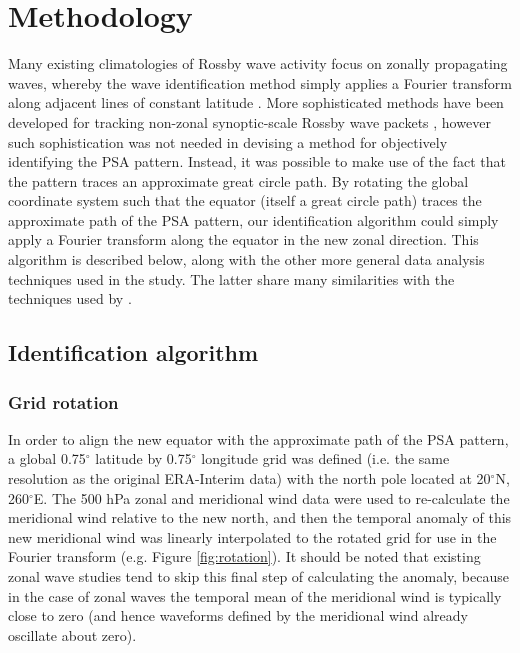 \section{Methodology}

Many existing climatologies of Rossby wave activity focus on zonally propagating waves, whereby the wave identification method simply applies a Fourier transform along adjacent lines of constant latitude \citep[e.g.][]{Glatt2014,IrvingSimmonds2015}. More sophisticated methods have been developed for tracking non-zonal synoptic-scale Rossby wave packets \citep[e.g.][]{Zimin2006,Souders2014}, however such sophistication was not needed in devising a method for objectively identifying the PSA pattern. Instead, it was possible to make use of the fact that the pattern traces an approximate great circle path. By rotating the global coordinate system such that the equator (itself a great circle path) traces the approximate path of the PSA pattern, our identification algorithm could simply apply a Fourier transform along the equator in the new zonal direction. This algorithm is described below, along with the other more general data analysis techniques used in the study. The latter share many similarities with the techniques used by \citet{IrvingSimmonds2015}.

\subsection{Identification algorithm}

\subsubsection{Grid rotation}

In order to align the new equator with the approximate path of the PSA pattern, a global 0.75$^{\circ}$ latitude by 0.75$^{\circ}$ longitude grid was defined (i.e. the same resolution as the original ERA-Interim data) with the north pole located at 20$^{\circ}$N, 260$^{\circ}$E. The 500 hPa zonal and meridional wind data were used to re-calculate the meridional wind relative to the new north, and then the temporal anomaly of this new meridional wind was linearly interpolated to the rotated grid for use in the Fourier transform (e.g. Figure \ref{fig:rotation}). It should be noted that existing zonal wave studies \citep[e.g.][]{IrvingSimmonds2015} tend to skip this final step of calculating the anomaly, because in the case of zonal waves the temporal mean of the meridional wind is typically close to zero (and hence waveforms defined by the meridional wind already oscillate about zero). 

